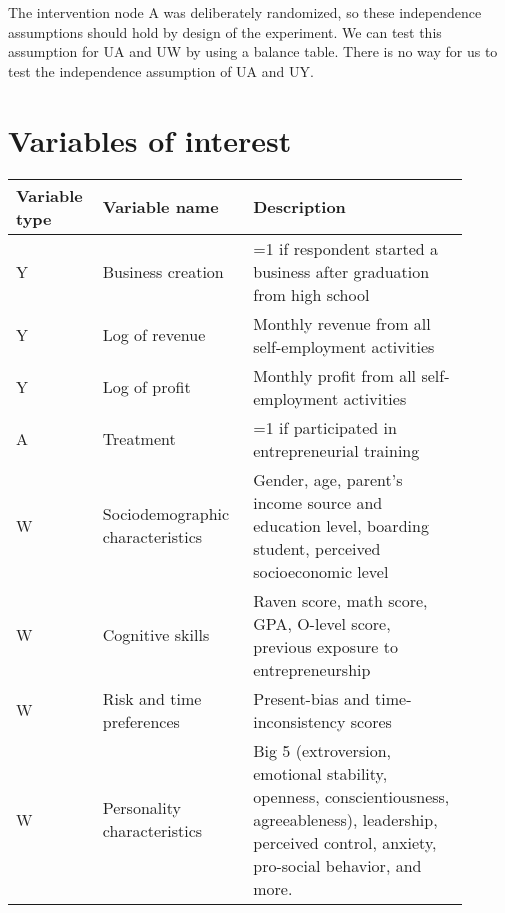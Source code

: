 The intervention node A was deliberately randomized, so these independence assumptions should hold by design of the experiment. We can test this assumption for UA and UW by using a balance table. There is no way for us to test the independence assumption of UA and UY.\\




\section{Variables of interest}
\label{sec:variables-interest}


\begin{center}
\begin{tabular}{ | p{0.15\linewidth} | p{0.3\linewidth} |  p{0.45\linewidth} | } 
 \hline
 Variable type & Variable name & Description \\ 

\hline
 Y & Business creation & =1 if respondent started a business after graduation from high school \\ 

\hline
 Y &Log of revenue & Monthly revenue from all self-employment activities \\ 

\hline 
Y & Log of profit & Monthly profit from all self-employment activities \\

\hline
A & Treatment & =1 if participated in entrepreneurial training \\

\hline
W & Sociodemographic characteristics & Gender, age, parent’s income source and education level, boarding student, perceived socioeconomic level \\

\hline
W & Cognitive skills & Raven score, math score, GPA, O-level score, previous exposure to entrepreneurship  \\

\hline
W & Risk and time preferences & Present-bias and time-inconsistency scores \\

\hline
W & Personality characteristics & Big 5 (extroversion, emotional stability, openness, conscientiousness, agreeableness), leadership, perceived control, anxiety, pro-social behavior, and more. \\

 \hline
\end{tabular}
\end{center}


